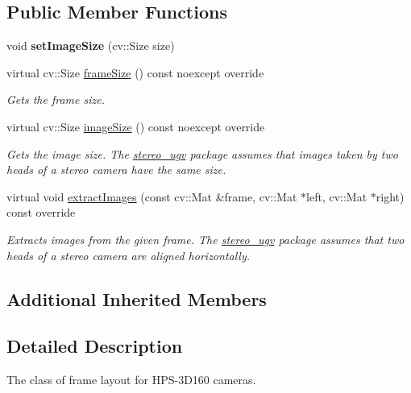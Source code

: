 \subsection*{Public Member Functions}
\begin{DoxyCompactItemize}
\item 
\mbox{\label{classstereo__ugv_1_1HPS3D160FrameLayout_af8ec41171a86b9ed3724d9e90b756fbb}} 
void {\bfseries set\+Image\+Size} (cv\+::\+Size size)
\item 
virtual cv\+::\+Size \hyperlink{classstereo__ugv_1_1HPS3D160FrameLayout_adce210d36dbcd42c685c2906e6ca37f3}{frame\+Size} () const noexcept override
\begin{DoxyCompactList}\small\item\em Gets the frame size. \end{DoxyCompactList}\item 
virtual cv\+::\+Size \hyperlink{classstereo__ugv_1_1HPS3D160FrameLayout_ac98bc2bb7cb4ed0eb28e33b162252832}{image\+Size} () const noexcept override
\begin{DoxyCompactList}\small\item\em Gets the image size. The \hyperlink{namespacestereo__ugv}{stereo\+\_\+ugv} package assumes that images taken by two heads of a stereo camera have the same size. \end{DoxyCompactList}\item 
virtual void \hyperlink{classstereo__ugv_1_1HPS3D160FrameLayout_ab5b1314aa6ab6744a647fb20efe659f1}{extract\+Images} (const cv\+::\+Mat \&frame, cv\+::\+Mat $\ast$left, cv\+::\+Mat $\ast$right) const override
\begin{DoxyCompactList}\small\item\em Extracts images from the given frame. The \hyperlink{namespacestereo__ugv}{stereo\+\_\+ugv} package assumes that two heads of a stereo camera are aligned horizontally. \end{DoxyCompactList}\end{DoxyCompactItemize}
\subsection*{Additional Inherited Members}


\subsection{Detailed Description}
The class of frame layout for H\+P\+S-\/3\+D160 cameras. 

